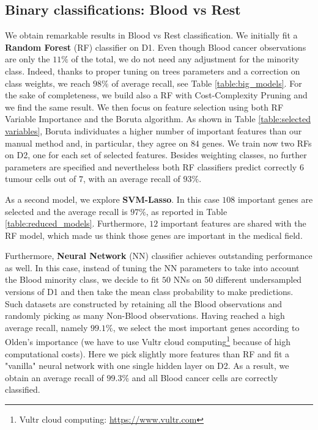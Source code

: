 \documentclass[a4paper,11pt, oneside]{article}  %
\begin{document}
\subsection{Binary classifications: Blood vs Rest}
We obtain remarkable results in Blood vs Rest classification. We initially fit a \textbf{Random Forest} (RF) classifier on D1. Even though Blood cancer observations are only the $11\%$ of the total,  we do not need any adjustment for the minority class.  Indeed, thanks to proper tuning on trees parameters and a correction on class weights, we reach $98\%$ of average recall,  see Table \ref{table:big_models}. For the sake of completeness, we build also a RF with Cost-Complexity Pruning and we find the same result. We then focus on feature selection using both RF Variable Importance and the Boruta algorithm. As shown in Table \ref{table:selected variables},  Boruta individuates a higher number of important features than our manual method and,  in particular,  they agree on $84$ genes. We train now two RFs on D2, one for each set of selected features. Besides weighting classes, no further parameters are specified and nevertheless both RF classifiers predict correctly $6$ tumour cells out of $7$,  with an average recall of $93\%$.

As a second model, we explore \textbf{SVM-Lasso}. In this case $108$ important genes are selected and the average recall is $97\%$, as reported in Table \ref{table:reduced_models}. Furthermore, $12$ important features are shared with the RF model, which made us think those genes are important in the medical field.

Furthermore, \textbf{Neural Network} (NN) classifier achieves outstanding performance as well.  In this case,  instead of tuning the NN parameters to take into account the Blood minority class,  we decide to fit $50$ NNs on $50$ different undersampled versions of D1 and then take the mean class probability to make predictions. Such datasets are constructed by retaining all the Blood observations and randomly picking as many Non-Blood observations.  Having reached a high average recall, namely $99.1\%$,  we select the most important genes according to Olden's importance (we have to use Vultr cloud computing\footnote{Vultr cloud computing: \url{https://www.vultr.com}} because of high computational costs). Here we pick slightly more features than RF and fit a "vanilla" neural network with one single hidden layer on D2.  As a result, we obtain an average recall of $99.3\%$ and all Blood cancer cells are correctly classified. 
\medskip
\end{document}
